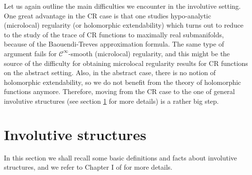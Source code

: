 \documentclass[11pt]{amsart}
\theoremstyle{definition}
\theoremstyle{remark}
\theoremstyle{plain}
\begin{document}
Let us again outline the main difficulties we encounter in the involutive setting. 
One great
advantage in the CR case is that one
studies hypo-analytic (microlocal) regularity (or holomorphic
extendability) which turns out to reduce to the study of  the trace of CR functions
to maximally real submanifolds, because of the Baouendi-Treves
approximation formula. The same type of  argument fails for
$\mathcal{C}^\infty$-smooth (microlocal) regularity, and this might be
the source of the difficulty for obtaining microlocal regularity
results for CR functions on the abstract setting. Also, in the
abstract case, there is no notion of holomorphic extendability, so we
do not benefit from the theory of holomorphic functions anymore.
Therefore, moving from  the CR case to the one of general
involutive structures (see section \ref{sec:involutive} for more
details) is a rather big step.


%
\section{Involutive structures}\label{sec:involutive}
%
In this section we shall recall some basic definitions and facts about
involutive structures, and we refer to Chapter I of \cite{cordarobook}
for more details.
\end{document}
